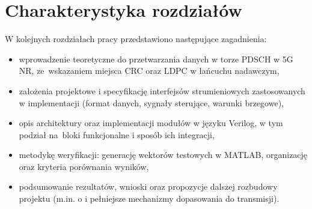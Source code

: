 \section{Charakterystyka rozdziałów}
\label{sec:wstep_rozdzialy}
W kolejnych rozdziałach pracy przedstawiono następujące zagadnienia:
\begin{itemize}
    \item wprowadzenie teoretyczne do przetwarzania danych w torze PDSCH w 5G NR, ze~wskazaniem miejsca CRC oraz LDPC w łańcuchu nadawczym,
    \item założenia projektowe i specyfikację interfejsów strumieniowych zastosowanych w implementacji (format danych, sygnały sterujące, warunki brzegowe),
    \item opis architektury oraz implementacji modułów w języku Verilog, w tym podział na~bloki funkcjonalne i sposób ich integracji,
    \item metodykę weryfikacji: generację wektorów testowych w MATLAB, organizację  oraz kryteria porównania wyników,
    \item podsumowanie rezultatów, wnioski oraz propozycje dalszej rozbudowy projektu (m.in. o  i pełniejsze mechanizmy dopasowania do transmisji).
\end{itemize}